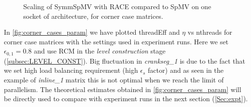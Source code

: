 \begin{figure}[tbhp]
	\centering
	\caption{Scaling of \acrshort{SymmSpMV} with \acrshort{RACE} compared to \acrshort{SpMV} on one socket of \SKX architecture, for corner case matrices.}
	\label{fig:corner_cases_scaling}
\end{figure}
 In \cref{fig:corner_cases_param} we have plotted \acrshort{threadEff} and $\eta$ vs \acrshort{nthreads} for corner case matrices with the settings used in experiment runs. Here we set $\epsilon_{0,1}=0.8$ and use \acrfull{RCM} in the \emph{level construction} stage (\cref{subsec:LEVEL_CONST}). Big fluctuation in \emph{crankseg\_1} is due to the fact that we set high load balancing requirement (high $\epsilon_s$ factor) and as seen in the example of \emph{inline\_1} matrix this is not optimal when we reach the limit of parallelism. The theoretical estimates obtained in \cref{fig:corner_cases_param} will be directly used to compare with experiment runs in the next section (\cref{Sec:expt}).

